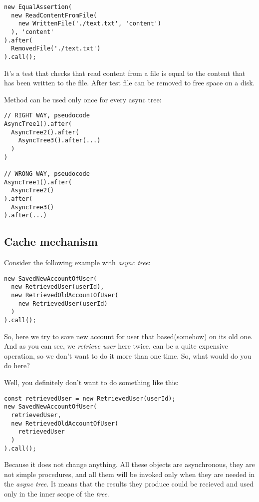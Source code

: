 \documentclass{article}
\newcommand{\cit}[1]{{\fontfamily{qcr}\selectfont{\textit{\textbf{\textcolor{darkgray}{#1}}}}}}
\begin{document}
\begin{lstlisting}
new EqualAssertion(
  new ReadContentFromFile(
    new WrittenFile('./text.txt', 'content')
  ), 'content'
).after(
  RemovedFile('./text.txt')
).call();
\end{lstlisting}

It's a test that checks that read content from a file is equal to the content that has been written to the file. After test file can be removed to free space on a disk.

Method \cit{after} can be used only once for every async tree:

\begin{lstlisting}
// RIGHT WAY, pseudocode
AsyncTree1().after(
  AsyncTree2().after(
    AsyncTree3().after(...)
  )
)

// WRONG WAY, pseudocode
AsyncTree1().after(
  AsyncTree2()
).after(
  AsyncTree3()
).after(...)
\end{lstlisting}

\subsection{Cache mechanism}

Consider the following example with  \textit{async tree}:

\begin{lstlisting}
new SavedNewAccountOfUser(
  new RetrievedUser(userId),
  new RetrievedOldAccountOfUser(
    new RetrievedUser(userId)
  )
).call();
\end{lstlisting}

So, here we try to save new account for user that based(somehow) on its old one. And as you can see, we \textit{retrieve user} here twice. \cit{RetrievedUser} can be a quite expensive operation, so we don't want to do it more than one time. So, what would do you do here?

Well, you definitely don't want to do something like this:

\begin{lstlisting}
const retrievedUser = new RetrievedUser(userId);
new SavedNewAccountOfUser(
  retrievedUser,
  new RetrievedOldAccountOfUser(
    retrievedUser
  )
).call();
\end{lstlisting}

Because it does not change anything. All these objects are asynchronous, they are not simple procedures, and all them will be invoked only when they are needed in the \textit{async tree}. It means that the results they produce could be recieved and used only in the inner scope of the \textit{tree}.
\end{document}

